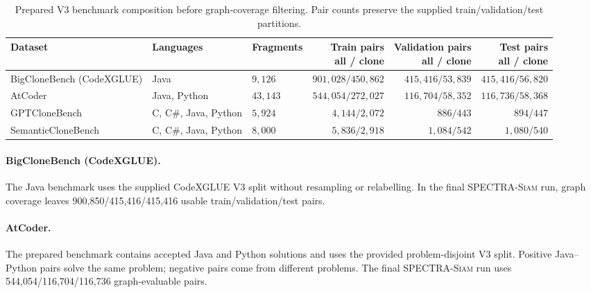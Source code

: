 \documentclass[authoryear,final,5p,times,twocolumn]{elsarticle}
\newcommand{\method}{\textsc{SPECTRA-Siam}}
\newcommand{\added}[1]{{\color{green!50!black}#1}}
\theoremstyle{plain}
\begin{document}
\begin{table}[t]
\centering
\caption{Prepared V3 benchmark composition before graph-coverage filtering. Pair
counts preserve the supplied train/validation/test partitions.}
\label{tab:dataset_counts}
\small
\renewcommand{\arraystretch}{1.12}
\begin{tabular}{lllrrr}
\toprule
Dataset & Languages & Fragments &
\shortstack{Train pairs\\all / clone} &
\shortstack{Validation pairs\\all / clone} &
\shortstack{Test pairs\\all / clone} \\
\midrule
BigCloneBench (CodeXGLUE) & Java & $9{,}126$ & $901{,}028 / 450{,}862$ & $415{,}416 / 53{,}839$ & $415{,}416 / 56{,}820$ \\
AtCoder & Java, Python & $43{,}143$ & $544{,}054 / 272{,}027$ & $116{,}704 / 58{,}352$ & $116{,}736 / 58{,}368$ \\
GPTCloneBench & C, C\#, Java, Python & $5{,}924$ & \added{$4{,}144 / 2{,}072$} & \added{$886 / 443$} & \added{$894 / 447$} \\
SemanticCloneBench & C, C\#, Java, Python & $8{,}000$ & $5{,}836 / 2{,}918$ & $1{,}084 / 542$ & $1{,}080 / 540$ \\
\bottomrule
\end{tabular}
\end{table}

\paragraph{BigCloneBench (CodeXGLUE).}
The Java benchmark uses the supplied CodeXGLUE V3 split without resampling or
relabelling. In the final \method{} run, graph coverage leaves
900,850/415,416/415,416 usable train/validation/test pairs.

\paragraph{AtCoder.}
The prepared benchmark contains accepted Java and Python solutions and uses the
provided problem-disjoint V3 split. Positive Java--Python pairs solve the same
problem; negative pairs come from different problems. The final \method{} run
uses 544,054/116,704/116,736 graph-evaluable pairs.
\end{document}
